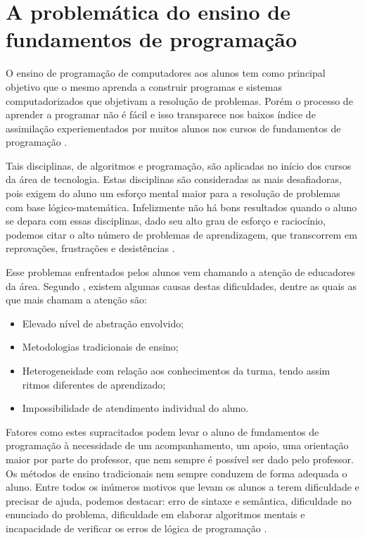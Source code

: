 \documentclass[pnumabnt,normaltoc,espacoumemeio,capchap]{abnt}
\begin{document}
\section{A problemática do ensino de fundamentos de programação}
\par O ensino de programação de computadores aos alunos tem como principal objetivo que o mesmo aprenda a construir programas e sistemas computadorizados que objetivam a resolução de problemas. Porém o processo de aprender a programar não é fácil e isso transparece nos baixos índice de assimilação experiementados por muitos alunos nos cursos de fundamentos de programação \cite{DB86}.
\par Tais disciplinas, de algoritmos e programação, são aplicadas no início dos cursos da área de tecnologia. Estas disciplinas são consideradas as mais desafiadoras, pois exigem do aluno um esforço mental maior para a resolução de problemas com base lógico-matemática. Infelizmente não há bons resultados quando o aluno se depara com essas disciplinas, dado seu alto grau de esforço e raciocínio, podemos citar o alto número de problemas de aprendizagem, que transcorrem em reprovações, frustrações e desistências \cite{DE08}.
\par Esse problemas enfrentados pelos alunos vem chamando a atenção de educadores da área. Segundo , existem algumas causas destas dificuldades, dentre as quais as que mais chamam a atenção são:
\begin{itemize}
	\item Elevado nível de abstração envolvido;
	\item Metodologias tradicionais de ensino;
	\item Heterogeneidade com relação aos conhecimentos da turma, tendo assim ritmos diferentes de aprendizado;
	\item Impossibilidade de atendimento individual do aluno. 
\end{itemize}
\par Fatores como estes supracitados podem levar o aluno de fundamentos de programação à necessidade de um acompanhamento, um apoio, uma orientação maior por parte do professor, que nem sempre é possível ser dado pelo professor. Os métodos de ensino tradicionais nem sempre conduzem de forma adequada o aluno. Entre todos os inúmeros motivos que levam os alunos a terem dificuldade e precisar de ajuda, podemos destacar: erro de sintaxe e semântica, dificuldade no enunciado do problema, dificuldade em elaborar algoritmos mentais e incapacidade de verificar os erros de lógica de programação \cite{GM00}.
\end{document}
